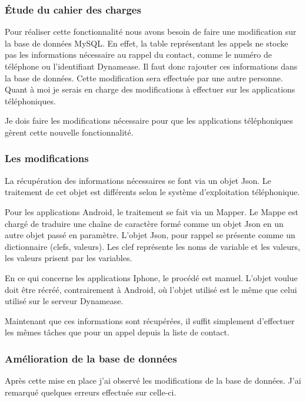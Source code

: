 \subsubsection{Étude du cahier des charges}

Pour réaliser cette fonctionnalité nous avons besoin de faire une modification sur la base de données MySQL. En effet, la table représentant les appels ne stocke pas les informations nécessaire au rappel du contact, comme le numéro de téléphone ou l'identifiant Dynamease. Il faut donc rajouter ces informations dans la base de données. Cette modification sera effectuée par une autre personne. Quant à moi je serais en charge des modifications à effectuer sur les applications téléphoniques.

Je dois faire les modifications nécessaire pour que les applications téléphoniques gèrent cette nouvelle fonctionnalité.

\subsubsection{Les modifications}

La récupération des informations nécessaires se font via un objet Json. Le traitement de cet objet est différents selon le système d'exploitation téléphonique.

Pour les applications Android, le traitement se fait via un Mapper. Le Mappe est chargé de traduire une chaîne de caractère formé comme un objet Json en un autre objet passé en paramètre. L'objet Json, pour rappel se présente comme un dictionnaire (clefs, valeurs). Les clef représente les noms de variable et les valeurs, les valeurs prisent par les variables.

En ce qui concerne les applications Iphone, le procédé est manuel. L'objet voulue doit être récréé, contrairement à Android, où l'objet utilisé est le même que celui utilisé sur le serveur Dynamease. 

Maintenant que ces informations sont récupérées, il suffit simplement d'effectuer les mêmes tâches que pour un appel depuis la liste de contact.

\subsubsection{Amélioration de la base de données}

Après cette mise en place j'ai observé les modifications de la base de données. J'ai remarqué quelques erreurs effectuée sur celle-ci.

